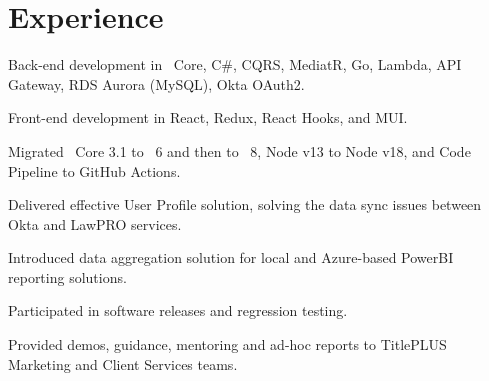 \documentclass[letterpaper]{cv_12} %
\begin{document}
\hfill
%
%
\begin{minipage}[t]{0.59\textwidth}%


    \section{Experience}

    \sectionspace%


    \vspace{\topsep}
    \begin{tightitemize}
        \item Back-end development in \dotnet\ Core, C\#, CQRS,
        MediatR, Go, Lambda, API Gateway, RDS Aurora (MySQL), Okta OAuth2.
        \item Front-end development in React, Redux, React Hooks, and
        MUI.\@
        \item Migrated \dotnet\ Core 3.1 to \dotnet\ 6 and then to \dotnet\ 8, 
        Node v13 to Node v18, and Code Pipeline to GitHub Actions.
        \item Delivered effective User Profile solution, solving the
        data sync issues between Okta and LawPRO services.
        \item Introduced data aggregation solution for local and
        Azure-based PowerBI reporting solutions.
        \item Participated in software releases and regression testing.
        \item Provided demos, guidance, mentoring and ad-hoc reports to 
        TitlePLUS Marketing and Client Services teams.
    \end{tightitemize}

    \sectionspace%



\end{minipage}
\end{document}
